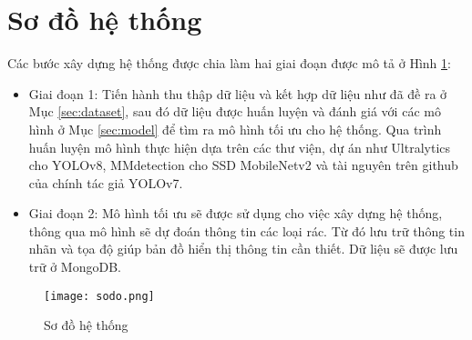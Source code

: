\documentclass[../the.tex]{subfiles}
\begin{document}
\section{Sơ đồ hệ thống}
\label{sec:sodo}
{\fontsize{13}{12} \selectfont

	Các bước xây dựng hệ thống được chia làm hai giai đoạn được mô tả ở Hình \ref{fig:sodo}:

	\begin{itemize}
		\item Giai đoạn 1: Tiến hành thu thập dữ liệu và kết hợp dữ liệu như đã đề ra ở Mục \ref{sec:dataset}, sau đó dữ liệu được huấn luyện và đánh giá với các mô hình ở Mục \ref{sec:model} để tìm ra mô hình tối ưu cho hệ thống.
		      Qua trình huấn luyện mô hình thực hiện dựa trên các thư viện, dự án như Ultralytics cho YOLOv8, MMdetection cho SSD MobileNetv2 và tài nguyên trên github của chính tác giả YOLOv7.
		\item Giai đoạn 2: Mô hình tối ưu sẽ được sử dụng cho việc xây dựng hệ thống, thông qua mô hình sẽ dự đoán thông tin các loại rác. Từ đó lưu trữ thông tin nhãn và tọa độ giúp bản đồ hiển thị thông tin cần thiết.
		      Dữ liệu sẽ được lưu trữ ở MongoDB.
	\end{itemize}

}

\begin{figure}[H]
	\centering
	\texttt{[image: sodo.png]}
	\caption{Sơ đồ hệ thống}
	\label{fig:sodo}
\end{figure}
\end{document}
